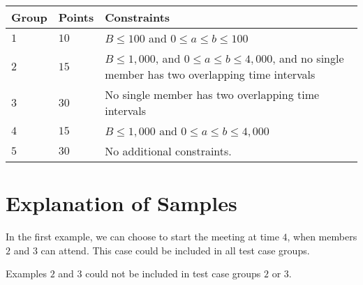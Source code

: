 \noindent
\begin{tabular}{| l | l | p{12cm} |}
  \hline
  \textbf{Group} & \textbf{Points} & \textbf{Constraints} \\ \hline
  $1$   & $10$       & $B \leq 100$ and $0 \leq a \leq b \leq 100$ \\ \hline
  $2$   & $15$       & $B \leq 1,000$, and $0 \leq a \leq b \leq 4,000$, and no single member has two overlapping time intervals \\ \hline
  $3$   & $30$       & No single member has two overlapping time intervals \\ \hline
  $4$   & $15$       & $B \leq 1,000$ and $0 \leq a \leq b \leq 4,000$ \\ \hline
  $5$    & $30$        &  No additional constraints. \\ \hline
\end{tabular}

\section*{Explanation of Samples}
In the first example, we can choose to start the meeting at time $4$, when members $2$ and $3$ can attend.
This case could be included in all test case groups.

Examples $2$ and $3$ could not be included in test case groups $2$ or $3$.

